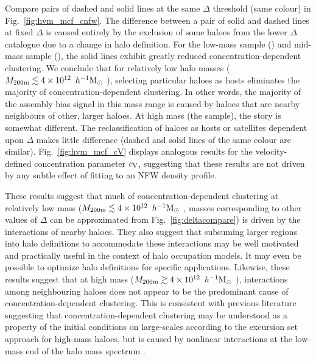 \documentclass[usenatbib,fleqn]{mnras}
\begin{document}
Compare pairs of dashed and solid lines at the same $\Delta$ threshold (same colour) in Fig.~\ref{fig:hvm_mcf_cnfw}. The difference between a pair of solid and dashed lines at fixed $\Delta$ is caused entirely by the exclusion of some haloes from the lower $\Delta$ catalogue due to a change in halo definition. For the low-mass sample (\simA) and mid-mass sample (\simB), the solid lines exhibit greatly reduced concentration-dependent clustering. We conclude that for relatively low halo masses ($M_{200{\rm m}} \lesssim 4 \times 10^{12}\, \ h^{-1}\mathrm{M}_{\odot}~$), selecting particular haloes as hosts eliminates the majority of concentration-dependent clustering. In other words, the majority of the assembly bias signal in this mass range is caused by haloes that are nearby neighbours of other, larger haloes. At high mass (the \simC{} sample), the story is somewhat different. The reclassification of haloes as hosts or satellites dependent upon $\Delta$ makes little difference (dashed and solid lines of the same colour are similar). Fig.~\ref{fig:hvm_mcf_cV} displays analogous results for the velocity-defined concentration parameter $c_{\rm V}$, suggesting that these results are not driven by any subtle effect of fitting to an NFW density profile. 

These results suggest that much of concentration-dependent clustering at relatively low mass ($M_{200{\rm m}} \lesssim 4 \times 10^{12}\, \ h^{-1}\mathrm{M}_{\odot}~$, masses corresponding to other values of $\Delta$ can be approximated from Fig.~\ref{fig:deltacompare}) is driven by the interactions of nearby haloes. They also suggest that subsuming larger regions into halo definitions to accommodate these interactions may be well motivated and practically useful in the context of halo occupation models. It may even be possible to optimize halo definitions for specific applications. Likewise, these results suggest that at high mass ($M_{200{\rm m}} \gtrsim 4 \times 10^{12}\, \ h^{-1}\mathrm{M}_{\odot}~$), interactions among neighbouring haloes does not appear to be the predominant cause of concentration-dependent clustering. This is consistent with previous literature suggesting that concentration-dependent clustering may be understood as a property of the initial conditions on large-scales according to the excursion set approach \citep{zentner07,dalal_etal08} for high-mass haloes, but is caused by nonlinear interactions at the low-mass end of the halo mass spectrum \citep[e.g.,][]{wang_etal08,warnick_etal08,dalal_etal08,hahn_etal09,ludlow_etal09,lacerna_padilla11}.
\end{document}
